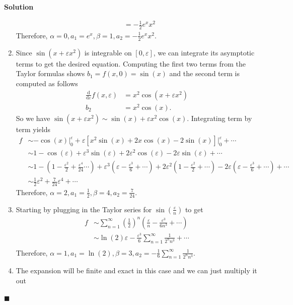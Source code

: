 \documentclass[11pt]{article}
\newcommand{\vep}{\varepsilon}
\theoremstyle{problemstyle}
\newenvironment{solution}
  {\noindent\textbf{Solution}\quad}
  {\hfill$\blacksquare$\par\vspace{1em}}
\begin{document}
\begin{solution}
\begin{enumerate}
\begin{align*}
            & = -\frac{1}{2} e^x x^2
      \end{align*}
      Therefore, $\alpha = 0, a_1 = e^x, \beta = 1, a_2 = -\frac{1}{2} e^x x^2$.
    \item Since $\sin(x + \vep x^2)$ is integrable on $[0,\vep]$, we can integrate its asymptotic
      terms to get the desired equation. Computing the first two terms from the Taylor formulas
      shows $b_1 = f(x, 0) = \sin(x)$ and the second term is computed as follows
      \begin{align*}
        \frac{\mathrm{d}}{\mathrm{d}\vep}f(x,\vep) & = x^2 \cos(x + \vep x^2) \\
        b_2 & = x^2 \cos(x).
      \end{align*}
      So we have $\sin(x + \vep x^2) \sim \sin(x) + \vep x^2 \cos(x)$. Integrating term by term
      yields 
      \begin{align*}
        f & \sim -\cos(x) \rvert_0^\vep + \vep \left[ x^2 \sin(x) + 2x \cos(x) - 2 \sin(x) \right]
            \rvert_0^\vep + \cdots \\
          & \sim 1 - \cos(\vep) + \vep^3 \sin(\vep) + 2\vep^2 \cos(\vep) - 2\vep\sin(\vep) + \cdots \\
          & \sim 1 - (1 - \frac{\vep^2}{2} + \frac{\vep^4}{24} \cdots) + \vep^3 \left( \vep -
            \frac{\vep^3}{6} + \cdots \right) + 2\vep^2 \left( 1 - \frac{\vep^2}{2} + \cdots \right) -
            2 \vep \left( \vep - \frac{\vep^3}{6} + \cdots \right) + \cdots \\
          & \sim \frac{1}{2} \vep^2 + \frac{7}{24} \vep^4 + \cdots
      \end{align*}
      Therefore, $\alpha = 2, a_1 = \frac{1}{2}, \beta = 4, a_2 = \frac{7}{24}$.
    \item Starting by plugging in the Taylor series for $\sin\left(\frac{\vep}{n}\right)$ to get
      \begin{align*}
        f & \sim \sum_{n=1}^{\infty} \left(\frac{1}{2}\right)^n \left( \frac{\vep}{n} -
            \frac{\vep^3}{6n^3} + \cdots \right) \\
          & \sim \ln(2) \vep - \frac{\vep^3}{6} \sum_{n=1}^{\infty} \frac{1}{2^n n^3} + \cdots \\
      \end{align*}
      Therefore, $\alpha = 1, a_1 = \ln(2), \beta = 3, a_2 = -\frac{1}{6} \sum_{n=1}^{\infty}
      \frac{1}{2^n n^3}$.
    \item The expansion will be finite and exact in this case and we can just multiply it out

\end{enumerate}
\end{solution}
\end{document}
